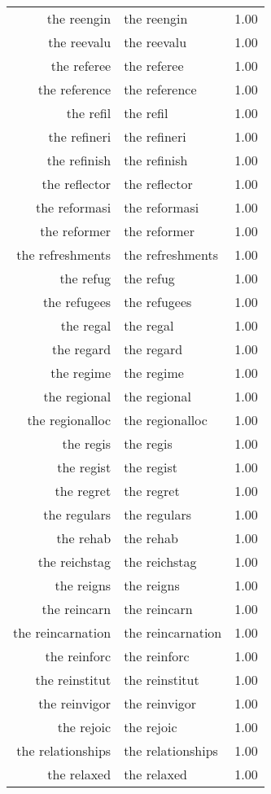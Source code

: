 \begin{table}[ht]
\begin{tabular}{rlr}
  the reengin & the reengin & 1.00 \\ 
  the reevalu & the reevalu & 1.00 \\ 
  the referee & the referee & 1.00 \\ 
  the reference & the reference & 1.00 \\ 
  the refil & the refil & 1.00 \\ 
  the refineri & the refineri & 1.00 \\ 
  the refinish & the refinish & 1.00 \\ 
  the reflector & the reflector & 1.00 \\ 
  the reformasi & the reformasi & 1.00 \\ 
  the reformer & the reformer & 1.00 \\ 
  the refreshments & the refreshments & 1.00 \\ 
  the refug & the refug & 1.00 \\ 
  the refugees & the refugees & 1.00 \\ 
  the regal & the regal & 1.00 \\ 
  the regard & the regard & 1.00 \\ 
  the regime & the regime & 1.00 \\ 
  the regional & the regional & 1.00 \\ 
  the regionalloc & the regionalloc & 1.00 \\ 
  the regis & the regis & 1.00 \\ 
  the regist & the regist & 1.00 \\ 
  the regret & the regret & 1.00 \\ 
  the regulars & the regulars & 1.00 \\ 
  the rehab & the rehab & 1.00 \\ 
  the reichstag & the reichstag & 1.00 \\ 
  the reigns & the reigns & 1.00 \\ 
  the reincarn & the reincarn & 1.00 \\ 
  the reincarnation & the reincarnation & 1.00 \\ 
  the reinforc & the reinforc & 1.00 \\ 
  the reinstitut & the reinstitut & 1.00 \\ 
  the reinvigor & the reinvigor & 1.00 \\ 
  the rejoic & the rejoic & 1.00 \\ 
  the relationships & the relationships & 1.00 \\ 
  the relaxed & the relaxed & 1.00 \\ 

\end{tabular}
\end{table}
